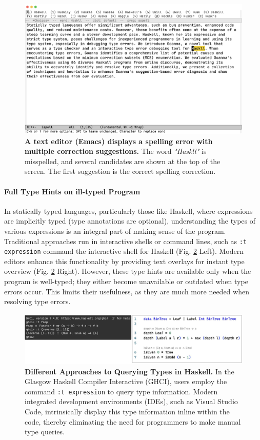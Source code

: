 \documentclass[pdflatex,lineno,sn-nature,Numbered]{sn-jnl}%
\begin{document}
\begin{figure}[hbt]
  \centering
  \includegraphics[width=0.8\linewidth]{images/ispell}
  \caption{{\bf A text editor (Emacs) displays a spelling error with multiple correction suggestions.} The word {\it "Haskll"} is misspelled, and several candidates are shown at the top of the screen. The first suggestion is the correct spelling correction.}
  \label{fig:ispell}
\end{figure}

\paragraph{Full Type Hints on ill-typed Program}

In statically typed languages, particularly those like Haskell, where expressions are implicitly typed (type annotations are optional), understanding the types of various expressions is an integral part of making sense of the program. Traditional approaches run in interactive shells or command lines, such as \texttt{:t expression} command the interactive shell for Haskell (Fig. \ref{fig:typehints} Left). Modern editors enhance this functionality by providing text overlays for instant type overview (Fig. \ref{fig:typehints} Right). However, these type hints are available only when the program is well-typed; they either become unavailable or outdated when type errors occur. This limits their usefulness, as they are much more needed when resolving type errors.

\begin{figure}[hbt]
  \centering
  \includegraphics[width=0.9\linewidth]{images/TypeHints.pdf}
  \caption{\textbf{Different Approaches to Querying Types in Haskell.} In the Glasgow Haskell Compiler Interactive (GHCI), users employ the command \texttt{:t expression} to query type information. Modern integrated development environments (IDEs), such as Visual Studio Code, intrinsically display this type information inline within the code, thereby eliminating the need for programmers to make manual type queries.}
  \label{fig:typehints}
\end{figure}
\end{document}
